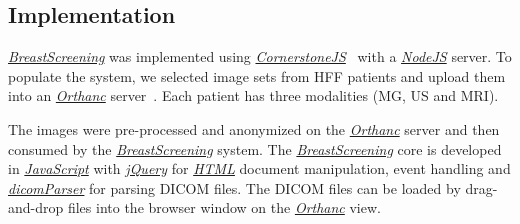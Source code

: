 \subsection{Implementation}

\href{https://breastscreening.github.io/}{{\it BreastScreening}} was implemented using \href{https://cornerstonejs.org/}{{\it CornerstoneJS}}~\cite{urban2017lesiontracker} with a \href{https://nodejs.org/}{{\it NodeJS}} server.
To populate the system, we selected image sets from HFF patients and upload them into an \href{https://www.orthanc-server.com/}{{\it Orthanc}} server~\cite{Jodogne2018}.
Each patient has three modalities (MG, US and MRI).

The images were pre-processed and anonymized on the \href{https://www.orthanc-server.com/}{{\it Orthanc}} server and then consumed by the \href{https://breastscreening.github.io/}{{\it BreastScreening}} system.
The \href{https://breastscreening.github.io/}{{\it BreastScreening}} core is developed in \href{https://www.w3schools.com/js/}{{\it JavaScript}} with \href{https://www.w3schools.com/jquery/}{{\it jQuery}} for \href{https://www.w3schools.com/html/}{{\it HTML}} document manipulation, event handling and \href{https://github.com/cornerstonejs/dicomParser}{{\it dicomParser}} for parsing DICOM files.
The DICOM files can be loaded by drag-and-drop files into the browser window on the \href{https://www.orthanc-server.com/}{{\it Orthanc}} view.